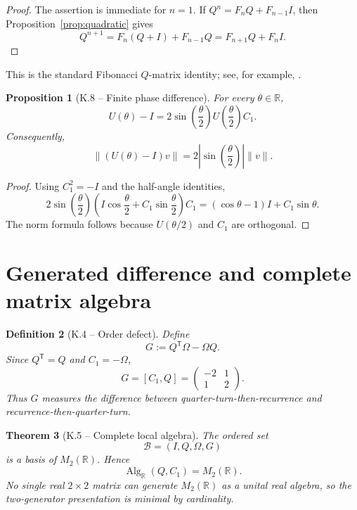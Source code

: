 \documentclass[11pt,letterpaper]{article}
\theoremstyle{kernelstyle}
\newtheorem{theorem}{Theorem}[section]
\newtheorem{proposition}[theorem]{Proposition}
\newtheorem{definition}[theorem]{Definition}
\newcommand{\R}{\mathbb{R}}
\newcommand{\Alg}{\operatorname{Alg}}
\begin{document}
\begin{proof}
The assertion is immediate for $n=1$.  If $Q^n=F_nQ+F_{n-1}I$, then Proposition~\ref{prop:quadratic} gives
\[
Q^{n+1}=F_n(Q+I)+F_{n-1}Q=F_{n+1}Q+F_nI.
\]
\end{proof}

This is the standard Fibonacci $Q$-matrix identity; see, for example, \cite{HardyWright}.

\begin{proposition}[K.8 -- Finite phase difference]\label{prop:phase-difference}
For every $\theta\in\R$,
\begin{equation}\label{eq:phase-difference}
U(\theta)-I
=
2\sin\!\left(\frac\theta2\right)
U\!\left(\frac\theta2\right)C_1.
\end{equation}
Consequently,
\begin{equation}
\|(U(\theta)-I)v\|
=2\left|\sin\!\left(\frac\theta2\right)\right|\|v\|.
\end{equation}
\end{proposition}

\begin{proof}
Using $C_1^2=-I$ and the half-angle identities,
\[
2\sin\!\left(\frac\theta2\right)
\left(I\cos\!\frac\theta2+C_1\sin\!\frac\theta2\right)C_1
=(\cos\theta-1)I+C_1\sin\theta.
\]
The norm formula follows because $U(\theta/2)$ and $C_1$ are orthogonal.
\end{proof}

\section{Generated difference and complete matrix algebra}\label{sec:algebra}

\begin{definition}[K.4 -- Order defect]
Define
\begin{equation}\label{eq:gdef}
G:=Q^{\mathsf T}\Omega-\Omega Q.
\end{equation}
Since $Q^{\mathsf T}=Q$ and $C_1=-\Omega$,
\begin{equation}\label{eq:gmatrix}
G=[C_1,Q]=
\begin{pmatrix}
-2&1\\
1&2
\end{pmatrix}.
\end{equation}
Thus $G$ measures the difference between quarter-turn-then-recurrence and recurrence-then-quarter-turn.
\end{definition}

\begin{theorem}[K.5 -- Complete local algebra]\label{thm:basis}
The ordered set
\begin{equation}
\mathcal B=(I,Q,\Omega,G)
\end{equation}
is a basis of $M_2(\R)$.  Hence
\begin{equation}
\Alg_{\R}(Q,C_1)=M_2(\R).
\end{equation}
No single real $2\times2$ matrix can generate $M_2(\R)$ as a unital real algebra, so the two-generator presentation is minimal by cardinality.
\end{theorem}
\end{document}
